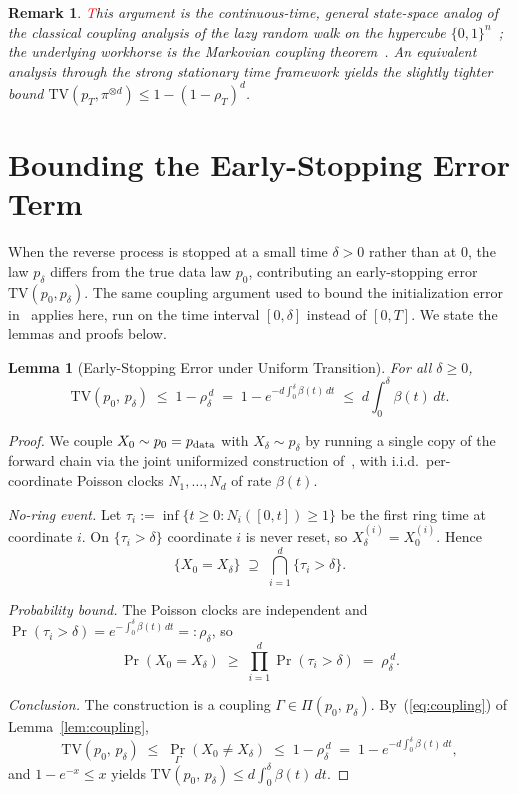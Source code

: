 \documentclass{article} %
\newtheorem{lemma}[theorem]{Lemma}
\newtheorem*{remark*}{Remark}
\def\eqref#1{equation~\ref{#1}}
\newcommand{\TV}{\mathrm{TV}}
\renewcommand{\eqref}[1]{\textup{(\ref{#1})}}
\begin{document}
\begin{remark*}
{\textcolor{red} This argument is the continuous-time, general state-space analog of the
classical coupling analysis of the lazy random walk on the hypercube
$\{0,1\}^n$~\citep[Chapter~5]{levin2017markov}; the underlying workhorse is
the Markovian coupling theorem~\citep[Theorem~5.2]{levin2017markov}. An
equivalent analysis through the strong stationary time framework
\citep[Chapter~6]{levin2017markov} yields the slightly tighter bound
$\TV(p_T, \pi^{\otimes d}) \le 1 - (1-\rho_T)^d$.}
\end{remark*}

\section{Bounding the Early-Stopping Error Term}
When the reverse process is stopped at a small time $\delta > 0$ rather than at $0$, the law $p_\delta$ differs from the true data law $p_0$, contributing an early-stopping error $\TV(p_0, p_\delta)$. The same coupling argument used to bound the initialization error in~ applies here, run on the time interval $[0,\delta]$ instead of $[0,T]$. We state the lemmas and proofs below.

\begin{lemma}[Early-Stopping Error under Uniform Transition]\label{lemma:early_stop_uniform}
For all $\delta \geq 0$,
\[
  \TV(p_0,\, p_\delta) \;\le\; 1 - \rho_\delta^{\,d} \;=\; 1 - e^{-d\int_0^\delta \beta(t)\,dt} \;\le\; d\int_0^\delta \beta(t)\,dt.
\]
\end{lemma}
\begin{proof}
We couple $X_0 \sim p_0 = p_{\rm data}$ with $X_\delta \sim p_\delta$ by running a single copy of the forward chain via the joint uniformized construction of~, with i.i.d.\ per-coordinate Poisson clocks $N_1,\dots,N_d$ of rate $\beta(t)$.
\medskip

\noindent\emph{No-ring event.} Let $\tau_i := \inf\{t \ge 0 : N_i([0,t]) \ge 1\}$ be the first ring time at coordinate $i$. On $\{\tau_i > \delta\}$ coordinate $i$ is never reset, so $X^{(i)}_\delta = X^{(i)}_0$. Hence
\[
  \{X_0 = X_\delta\} \;\supseteq\; \bigcap_{i=1}^d \{\tau_i > \delta\}.
\]
\medskip

\noindent\emph{Probability bound.} The Poisson clocks are independent and $\Pr(\tau_i > \delta) = e^{-\int_0^\delta \beta(t)\,dt}=:\rho_\delta $, so
\[
  \Pr(X_0 = X_\delta) \;\ge\; \prod_{i=1}^d \Pr(\tau_i > \delta) \;=\; \rho_\delta^{\,d}.
\]
\medskip

\noindent\emph{Conclusion.} The construction is a coupling $\Gamma \in \Pi(p_0,\, p_\delta)$. By~\eqref{eq:coupling} of Lemma~\ref{lem:coupling},
\[
  \TV(p_0,\, p_\delta) \;\le\; \Pr_\Gamma(X_0 \neq X_\delta) \;\le\; 1 - \rho_\delta^{\,d} \;=\; 1 - e^{-d\int_0^\delta \beta(t)\,dt},
\]
and $1 - e^{-x} \le x$ yields $\TV(p_0,\, p_\delta) \le d\int_0^\delta \beta(t)\,dt$. \qedhere
\end{proof}
\end{document}
